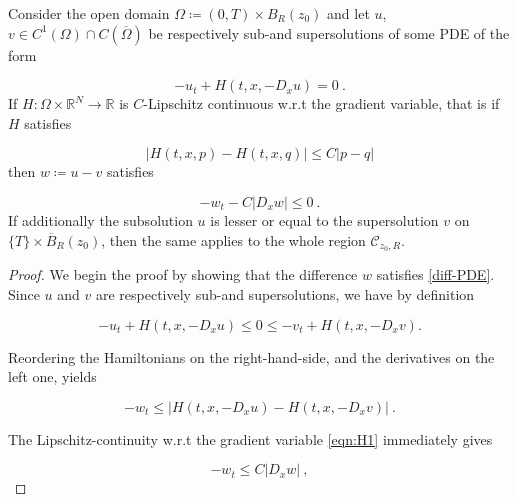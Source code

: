 \begin{theorem}
			\label{smooth_loc} 
			Consider the open domain $ \Omega \coloneqq \left( 0, T \right) \times B_R(z_0) $ and let $ u $, $ v \in C^{1}(\Omega) \cap C(\overline{\Omega}) $ be respectively sub-and supersolutions of some PDE of the form
			
			\begin{equation*}
				-u_t + H(t, x, -D_x u) = 0 \ .
			\end{equation*}
			If $ H : \Omega \times \mathbb{R}^{N} \to \mathbb{R} $ is $ C $-Lipschitz continuous w.r.t the gradient variable, that is if $ H $ satisfies
			
			\begin{equation}
				\tag{H1}
				\lvert H(t, x, p) - H(t, x, q) \rvert \leq C \lvert p - q \rvert
				\label{eqn:H1}
			\end{equation}
			then $ w \coloneqq u - v $ satisfies
			
			\begin{equation}
				\label{diff-PDE}
				-w_t - C \lvert D_x w \rvert \leq 0 \ .
			\end{equation}
			If additionally the subsolution $ u $ is lesser or equal to the supersolution $ v $ on $ \{ T \} \times \overline{B}_R (z_0) $, then the same applies to the whole region $ \mathcal{C}_{z_0, R} $.
			
			\begin{proof}
				We begin the proof by showing that the difference $ w $ satisfies \eqref{diff-PDE}. Since $ u $ and $ v $ are respectively sub-and supersolutions, we have by definition
				
				\begin{equation*}
					-u_t + H(t, x, -D_x u) \leq 0 \leq -v_t + H(t, x, -D_x v) .
				\end{equation*}
				
				Reordering the Hamiltonians on the right-hand-side, and the derivatives on the left one, yields
				
				\begin{equation*}
					-w_t \leq \lvert H(t, x, -D_x u) - H(t, x, -D_x v) \rvert \ .
				\end{equation*}
				
				The Lipschitz-continuity w.r.t the gradient variable \eqref{eqn:H1} immediately gives
				
				\begin{equation*}
					-w_t \leq C \lvert D_x w \rvert \ ,
				\end{equation*}
				

\end{proof}
\end{theorem}
